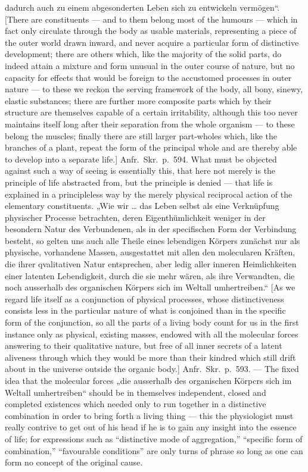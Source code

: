 \documentclass[12pt,a4paper]{book}
\begin{document}
{dadurch auch zu einem abgesonderten Leben sich zu entwickeln vermögen“.
[There are constituents --- and to them belong most of the humours --- which in
fact only circulate through the body as usable materials, representing a piece
of the outer world drawn inward, and never acquire a particular form of
distinctive development; there are others which, like the majority of the solid
parts, do indeed attain a mixture and form unusual in the outer course of
nature, but no capacity for effects that would be foreign to the accustomed
processes in outer nature --- to these we reckon the serving framework of the
body, all bony, sinewy, elastic substances; there are further more composite
parts which by their structure are themselves capable of a certain
irritability, although this too never maintains itself long after their
separation from the whole organism --- to these belong the muscles; finally
there are still larger part-wholes which, like the branches of a plant, repeat
the form of the principal whole and are thereby able to develop into a separate
life.] Anfr.\ Skr.\ p.~594. What must be objected against such a way of seeing
is essentially this, that here not merely is the principle of life abstracted
from, but the principle is denied --- that life is explained in a principleless
way by the merely physical reciprocal action of the elementary constituents.
„Wie wir \dots{}
das Leben selbst als eine Verknüpfung physischer Processe betrachten,
deren Eigenthümlichkeit weniger in der besondern Natur des Verbundenen,
als in der specifischen Form der Verbindung besteht, so gelten uns auch
alle Theile eines lebendigen Körpers zunächst nur als physische,
vorhandene
Massen, ausgestattet mit allen den molecularen Kräften, die ihrer
qvalitativen Natur entsprechen, aber ledig aller inneren Heimlichkeiten
einer latenten Lebendigkeit, durch die sie mehr wären, als ihre
Verwandten, die noch ausserhalb des organischen Körpers sich im Weltall
umhertreiben.“ [As we regard life itself as a conjunction of physical
processes, whose distinctiveness consists less in the particular nature of what
is conjoined than in the specific form of the conjunction, so all the parts of
a living body count for us in the first instance only as physical, existing
masses, endowed with all the molecular forces answering to their qualitative
nature, but free of all inner secrets of a latent aliveness through which they
would be more than their kindred which still drift about in the universe
outside the organic body.] Anfr.\ Skr.\ p.~593. --- The fixed idea that the
molecular forces „die ausserhalb des organischen Körpcrs sich im Weltall
umhertreiben“ should be in themselves independent, closed and completed
existences which needed only to run together in a distinctive combination in
order to bring forth a living thing --- this the physiologist must really
contrive to get out of his head if he is to gain any insight into the essence
of life; for expressions such as ``distinctive mode of aggregation,''
``specific form of combination,'' ``favourable conditions'' are only turns of
phrase so long as one can form no concept of the original cause.}
\end{document}
